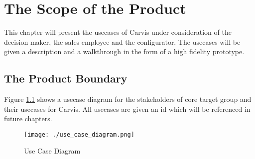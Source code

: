 \chapter{The Scope of the Product}
This chapter will present the \glspl{usecase} of Carvis under consideration of the decision maker, the sales employee and the configurator. The \glspl{usecase} will be given a description and a walkthrough in the form of a high fidelity prototype.
\section{The Product Boundary}
Figure \ref{SopeOfProduct:ContextDiagram} shows a \gls{usecase} diagram for the \glspl{stakeholder} of core target group and their \glspl{usecase} for Carvis. All \glspl{usecase} are given an id which will be referenced in future chapters.
\begin{figure}[H]
  \centering
  \texttt{[image: ./use\_case\_diagram.png]}
  \caption{Use Case Diagram}
  \label{SopeOfProduct:ContextDiagram}
\end{figure}

